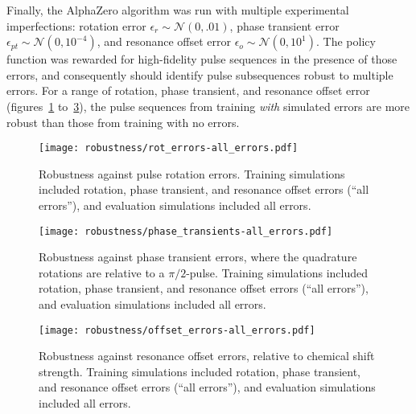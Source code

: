 Finally, the AlphaZero algorithm was run with multiple experimental imperfections: rotation error $\epsilon_r \sim \mathcal{N}(0, .01)$, phase transient error $\epsilon_{pt} \sim \mathcal{N}(0, 10^{-4})$, and resonance offset error $\epsilon_o \sim \mathcal{N}(0, 10^1)$.
The policy function was rewarded for high-fidelity pulse sequences in the presence of those errors, and consequently should identify pulse subsequences robust to multiple errors. For a range of rotation, phase transient, and resonance offset error (figures~\ref{fig:rot_errors-all_errors} to~\ref{fig:offset_errors-all_errors}), the pulse sequences from training \emph{with} simulated errors are more robust than those from training with no errors.

\begin{figure}[H]
    \centering
    \texttt{[image: robustness/rot\_errors-all\_errors.pdf]}
    \caption{
    Robustness against pulse rotation errors.
    Training simulations included rotation, phase transient, and resonance offset errors (``all errors''), and evaluation simulations included all errors.
    }
    \label{fig:rot_errors-all_errors}
\end{figure}

\begin{figure}[H]
    \centering
    \texttt{[image: robustness/phase\_transients-all\_errors.pdf]}
    \caption{
    Robustness against phase transient errors, where the quadrature rotations are relative to a $\pi/2$-pulse.
    Training simulations included rotation, phase transient, and resonance offset errors (``all errors''), and evaluation simulations included all errors.
    }
    \label{fig:phase_transients-all_errors}
\end{figure}

\begin{figure}[H]
    \centering
    \texttt{[image: robustness/offset\_errors-all\_errors.pdf]}
    \caption{
    Robustness against resonance offset errors, relative to chemical shift strength.
    Training simulations included rotation, phase transient, and resonance offset errors (``all errors''), and evaluation simulations included all errors.
    }
    \label{fig:offset_errors-all_errors}
\end{figure}

